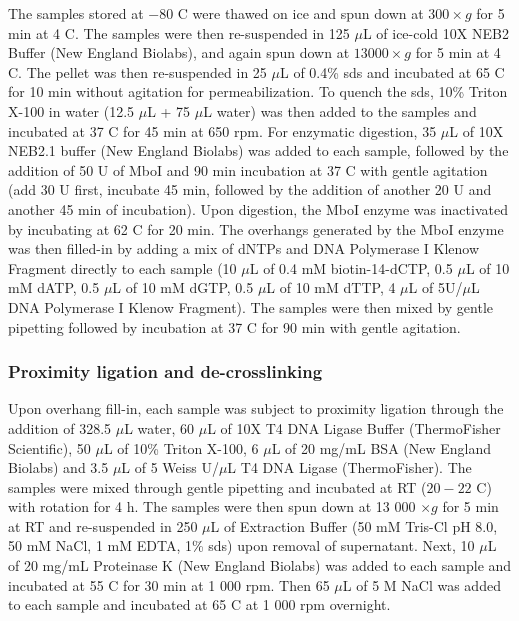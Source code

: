 The samples stored at $-80$ \textdegree C were thawed on ice and spun down at $300 \times g$ for 5 min at 4 \textdegree C.
The samples were then re-suspended in 125 $\mu$L of ice-cold 10X NEB2 Buffer (New England Biolabs), and again spun down at $13 000 \times g$ for 5 min at 4 \textdegree C.
The pellet was then re-suspended in 25 $\mu$L of 0.4\% \gls{sds} and incubated at 65 \textdegree C for 10 min without agitation for permeabilization.
To quench the \gls{sds}, 10\% Triton X-100 in water (12.5 $\mu$L + 75 $\mu$L water) was then added to the samples and incubated at 37 \textdegree C for 45 min at 650 rpm.
For enzymatic digestion, 35 $\mu$L of 10X NEB2.1 buffer (New England Biolabs) was added to each sample, followed by the addition of 50 U of MboI and 90 min incubation at 37 \textdegree C with gentle agitation (add 30 U first, incubate 45 min, followed by the addition of another 20 U and another 45 min of incubation).
Upon digestion, the MboI enzyme was inactivated by incubating at 62 \textdegree C for 20 min.
The overhangs generated by the MboI enzyme was then filled-in by adding a mix of dNTPs and DNA Polymerase I Klenow Fragment directly to each sample (10 $\mu$L of 0.4 mM biotin-14-dCTP, 0.5 $\mu$L of 10 mM dATP, 0.5 $\mu$L of 10 mM dGTP, 0.5 $\mu$L of 10 mM dTTP, 4 $\mu$L of 5U/$\mu$L DNA Polymerase I Klenow Fragment).
The samples were then mixed by gentle pipetting followed by incubation at 37 \textdegree C for 90 min with gentle agitation.

\subsubsection{Proximity ligation and de-crosslinking}

Upon overhang fill-in, each sample was subject to proximity ligation through the addition of 328.5 $\mu$L water, 60 $\mu$L of 10X T4 DNA Ligase Buffer (ThermoFisher Scientific), 50 $\mu$L of 10\% Triton X-100, 6 $\mu$L of 20 mg/mL BSA (New England Biolabs) and 3.5 $\mu$L of 5 Weiss U/$\mu$L T4 DNA Ligase (ThermoFisher).
The samples were mixed through gentle pipetting and incubated at RT ($20-22$ \textdegree C) with rotation for 4 h.
The samples were then spun down at 13 000 $\times g$ for 5 min at RT and re-suspended in 250 $\mu$L of Extraction Buffer (50 mM Tris-Cl pH 8.0, 50 mM NaCl, 1 mM EDTA, 1\% \gls{sds}) upon removal of supernatant.
Next, 10 $\mu$L of 20 mg/mL Proteinase K (New England Biolabs) was added to each sample and incubated at 55 \textdegree C for 30 min at 1 000 rpm.
Then 65 $\mu$L of 5 M NaCl was added to each sample and incubated at 65 \textdegree C at 1 000 rpm overnight.

